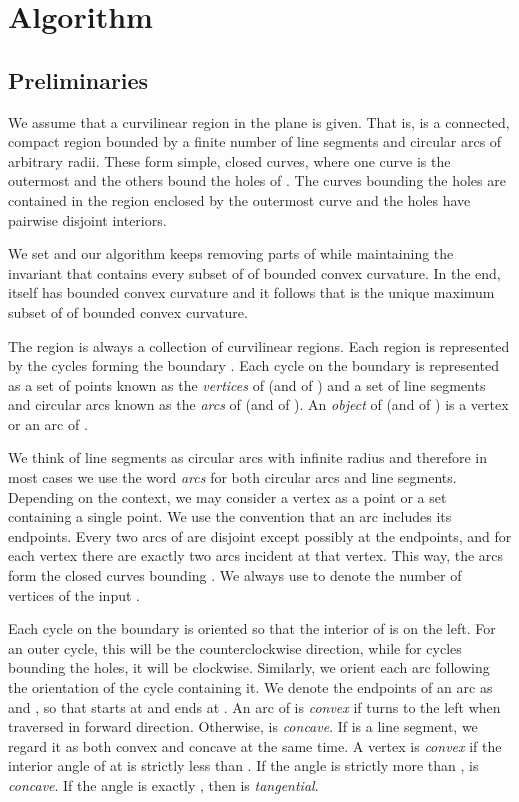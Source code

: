 \documentclass{article}
\begin{document}
\section{Algorithm}\label{algoDescription}

\subsection{Preliminaries}

We assume that a curvilinear region  in the plane is given.
That is,  is a connected, compact region bounded by a finite number of line segments and circular arcs of arbitrary radii.
These form simple, closed curves, where one curve is the outermost and the others bound the holes of .
The curves bounding the holes are contained in the region enclosed by the outermost curve and the holes have pairwise disjoint interiors.

We set  and our algorithm keeps removing parts of 
while maintaining the invariant that
 contains every subset of
 of bounded convex curvature.
In the end,  itself has bounded convex curvature and it follows
that  is the unique maximum subset of 
of bounded convex curvature.

The region  is always a collection of curvilinear regions.
Each region  is represented by the cycles forming the boundary .
Each cycle on the boundary  is represented as a set of points known as the \emph{vertices}
of  (and of ) and a set of line segments and circular arcs known as the \emph{arcs}
of  (and of ).
An \emph{object} of  (and of ) is a vertex or an arc of .

We think of line segments as circular arcs with infinite radius and therefore in most cases we use the word \emph{arcs} for both circular arcs and line segments.
Depending on the context, we may consider a vertex as a point or a set
containing a single point.
We use the convention that an arc includes its endpoints.
Every two arcs of  are disjoint except possibly at the endpoints, and
for each vertex there are exactly two arcs incident at that vertex.
This way, the arcs form the closed curves bounding .
We always use  to denote the number of vertices of the input .

Each cycle on the boundary  is oriented so that the interior of  is on the left.
For an outer cycle, this will be the counterclockwise direction, while for cycles bounding the holes, it will be clockwise.
Similarly, we orient each arc following the orientation of the cycle containing it.
We denote the endpoints of an arc  as  and , so that  starts at  and ends at .
An arc  of  is \emph{convex} if  turns to the left when traversed in forward direction.
Otherwise,  is \emph{concave}.
If  is a line segment, we regard it as both convex and concave at the same time.
A vertex  is \emph{convex} if the interior angle of  at  is strictly less
than . If the angle is strictly more than ,  is \emph{concave}.
If the angle is exactly , then  is \emph{tangential}.
\end{document}
